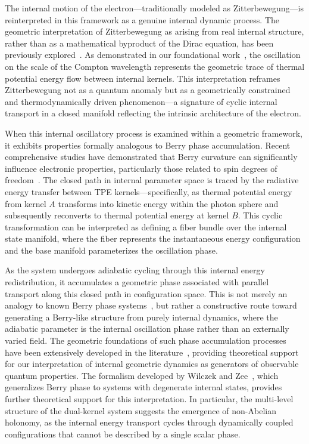 \documentclass[%
 reprint,
 amsmath,amssymb,
 aps,
]{revtex4-1}
\numberwithin{equation}{section}%
\begin{document}
The internal motion of the electron—traditionally modeled as Zitterbewegung—is reinterpreted in this framework as a genuine internal dynamic process. The geometric interpretation of Zitterbewegung as arising from real internal structure, rather than as a mathematical byproduct of the Dirac equation, has been previously explored~\cite{barut1981zitterbewegung}. As demonstrated in our foundational work~\cite{hanamura1811.0312}, the oscillation on the scale of the Compton wavelength represents the geometric trace of thermal potential energy flow between internal kernels. This interpretation reframes Zitterbewegung not as a quantum anomaly but as a geometrically constrained and thermodynamically driven phenomenon—a signature of cyclic internal transport in a closed manifold reflecting the intrinsic architecture of the electron. 

When this internal oscillatory process is examined within a geometric framework, it exhibits properties formally analogous to Berry phase accumulation. Recent comprehensive studies have demonstrated that Berry curvature can significantly influence electronic properties, particularly those related to spin degrees of freedom~\cite{xiao2010berry}. The closed path in internal parameter space is traced by the radiative energy transfer between TPE kernels—specifically, as thermal potential energy from kernel $A$ transforms into kinetic energy within the photon sphere and subsequently reconverts to thermal potential energy at kernel $B$. This cyclic transformation can be interpreted as defining a fiber bundle over the internal state manifold, where the fiber represents the instantaneous energy configuration and the base manifold parameterizes the oscillation phase.

As the system undergoes adiabatic cycling through this internal energy redistribution, it accumulates a geometric phase associated with parallel transport along this closed path in configuration space. This is not merely an analogy to known Berry phase systems~\cite{berry1984quantal}, but rather a constructive route toward generating a Berry-like structure from purely internal dynamics, where the adiabatic parameter is the internal oscillation phase rather than an externally varied field. The geometric foundations of such phase accumulation processes have been extensively developed in the literature~\cite{shapere1989geometric}, providing theoretical support for our interpretation of internal geometric dynamics as generators of observable quantum properties. The formalism developed by Wilczek and Zee~\cite{wilczek1984appearance}, which generalizes Berry phase to systems with degenerate internal states, provides further theoretical support for this interpretation. In particular, the multi-level structure of the dual-kernel system suggests the emergence of non-Abelian holonomy, as the internal energy transport cycles through dynamically coupled configurations that cannot be described by a single scalar phase.
\end{document}
